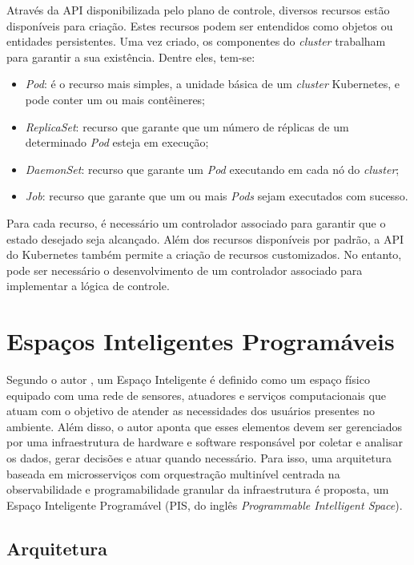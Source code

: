 Através da API disponibilizada pelo plano de controle, diversos recursos estão disponíveis para criação. Estes recursos podem ser entendidos como objetos ou entidades persistentes. Uma vez criado, os componentes do \textit{cluster} trabalham para garantir a sua existência. Dentre eles, tem-se:
\begin{itemize}
    \item \textit{Pod}: é o recurso mais simples, a unidade básica de um \textit{cluster} Kubernetes, e pode conter um ou mais contêineres;
    \item \textit{ReplicaSet}: recurso que garante que um número de réplicas de um determinado \textit{Pod} esteja em execução;
    \item \textit{DaemonSet}: recurso que garante um \textit{Pod} executando em cada nó do \textit{cluster};
    \item \textit{Job}: recurso que garante que um ou mais \textit{Pods} sejam executados com sucesso.
\end{itemize}

Para cada recurso, é necessário um controlador associado para garantir que o estado desejado seja alcançado. Além dos recursos disponíveis por padrão, a API do Kubernetes também permite a criação de recursos customizados. No entanto, pode ser necessário o desenvolvimento de um controlador associado para implementar a lógica de controle.

\section{Espaços Inteligentes Programáveis}

Segundo o autor , um Espaço Inteligente é definido como um espaço físico equipado com uma rede de sensores, atuadores e serviços computacionais que atuam com o objetivo de atender as necessidades dos usuários presentes no ambiente. Além disso, o autor aponta que esses elementos devem ser gerenciados por uma infraestrutura de hardware e software responsável por coletar e analisar os dados, gerar decisões e atuar quando necessário. Para isso, uma arquitetura baseada em microsserviços com orquestração multinível centrada na observabilidade e programabilidade granular da infraestrutura é proposta, um Espaço Inteligente Programável (PIS, do inglês \textit{Programmable Intelligent Space}).

\subsection{Arquitetura}

